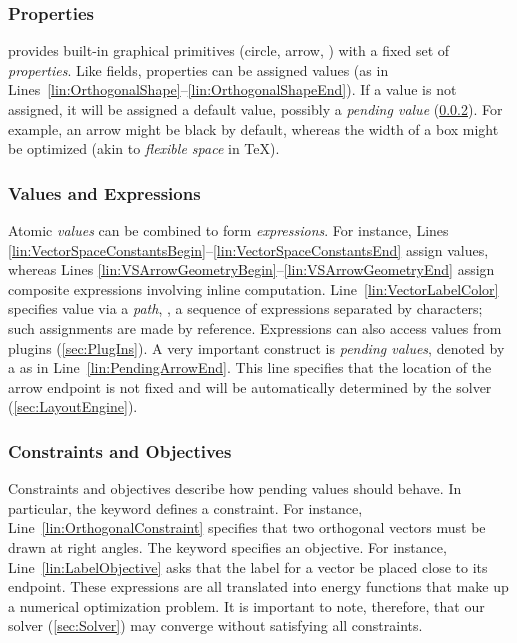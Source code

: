 \subsubsection{Properties}
\label{sec:Properties}

\Style{} provides built-in graphical primitives (circle, arrow, \etc{}) with a fixed set of \emph{properties}. Like fields, properties can be assigned values (as in Lines~\ref{lin:OrthogonalShape}--\ref{lin:OrthogonalShapeEnd}). If a value is not assigned, it will be assigned a default value, possibly a \emph{pending value} (\cref{sec:ValuesAndExpressions}).  For example, an arrow might be black by default, whereas the width of a box might be optimized (akin to \emph{flexible space} in \TeX).


\subsubsection{Values and Expressions}
\label{sec:ValuesAndExpressions}

Atomic \emph{values} can be combined to form \emph{expressions}.  For instance, Lines \ref{lin:VectorSpaceConstantsBegin}--\ref{lin:VectorSpaceConstantsEnd} assign values, whereas Lines \ref{lin:VSArrowGeometryBegin}--\ref{lin:VSArrowGeometryEnd} assign composite expressions involving inline computation.  Line~\ref{lin:VectorLabelColor} specifies value via a \emph{path}, \ie, a sequence of expressions separated by  characters; such assignments are made by reference.  Expressions can also access values from plugins (\cref{sec:PlugIns}).  A very important construct is \emph{pending values}, denoted by a  as in Line~\ref{lin:PendingArrowEnd}.  This line specifies that the location of the arrow endpoint is not fixed and will be automatically determined by the solver (\cref{sec:LayoutEngine}).

\subsubsection{Constraints and Objectives}
\label{sec:ConstraintsAndObjectives}

Constraints and objectives describe how pending values should behave.  In particular, the  keyword defines a constraint. For instance, Line~\ref{lin:OrthogonalConstraint} specifies that two orthogonal vectors must be drawn at right angles.  The  keyword specifies an objective. For instance, Line~\ref{lin:LabelObjective} asks that the label for a vector be placed close to its endpoint. These expressions are all translated into energy functions that make up a numerical optimization problem. It is important to note, therefore, that our solver (\cref{sec:Solver}) may converge without satisfying all constraints.


